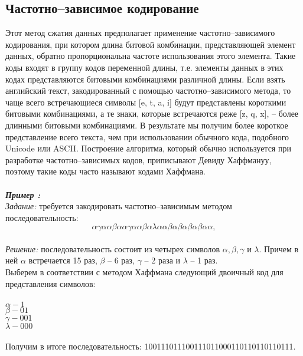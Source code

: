 \subsection{Частотно--зависимое кодирование}
Этот метод сжатия данных предполагает применение частотно--зависимого кодирования, при котором длина битовой комбинации, представляющей элемент данных, обратно пропорциональна частоте использования этого элемента. Такие коды входят в группу кодов переменной длины, т.е. элементы данных в этих кодах представляются битовыми комбинациями различной длины. Если взять английский текст, закодированный с помощью частотно--зависимого метода, то чаще всего встречающиеся символы [e, t, a, i] будут представлены короткими битовыми комбинациями, а те знаки, которые встречаются реже [z, q, x], -- более длинными битовыми комбинациями. В результате мы получим более короткое представление всего текста, чем при использовании обычного кода, подобного Unicode или ASCII. Построение алгоритма, который обычно используется при разработке частотно--зависимых кодов, приписывают Девиду Хаффмануу, поэтому такие коды часто называют кодами Хаффмана.\\
\\\emph{\textbf{Пример :}}
\\\emph{Задание:} требуется закодировать частотно--зависимым методом последовательность:\\ $$\alpha\gamma\alpha\alpha\beta\alpha\alpha\gamma\alpha\alpha\beta\alpha\lambda\alpha\alpha\beta\alpha\beta\alpha\beta\alpha\beta\alpha\alpha,$$
\\\emph{Решение:} последовательность состоит из четырех символов $\alpha, \beta, \gamma$ и $\lambda$. Причем в ней $\alpha$ встречается 15 раз, $\beta$ -- 6 раз, $\gamma$ -- 2 раза и $\lambda$ -- 1 раз.\\
Выберем в соответствии с методом Хаффмана следующий двоичный код для представления символов:\\
\\$\alpha - 1$
\\$\beta - 01$
\\$\gamma - 001$
\\$\lambda - 000$\\
\\Получим в итоге последовательность: 100111011100111011000110110110110111.
